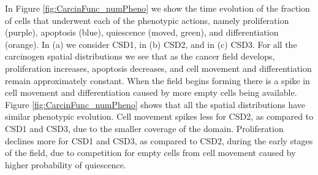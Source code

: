 \documentclass[\main/thesis.tex]{subfiles}
\begin{document}
In Figure \ref{fig:CarcinFunc_numPheno} we show the time evolution of the fraction of cells that underwent each of the phenotypic actions, namely proliferation (purple), apoptosis (blue), quiescence (moved, green), and differentiation (orange). In (a) we consider CSD1, in (b) CSD2, and in (c) CSD3. For all the carcinogen spatial distributions we see that as the cancer field develops, proliferation increases, apoptosis decreases, and cell movement and differentiation remain approximately constant. When the field begins forming there is a spike in cell movement and differentiation caused by more empty cells being available. Figure \ref{fig:CarcinFunc_numPheno} shows that all the spatial distributions have similar phenotypic evolution. Cell movement spikes less for CSD2, as compared to CSD1 and CSD3, due to the smaller coverage of the domain. Proliferation declines more for CSD1 and CSD3, as compared to CSD2, during the early stages of the field, due to competition for empty cells from cell movement caused by higher probability of quiescence. 
\end{document}
